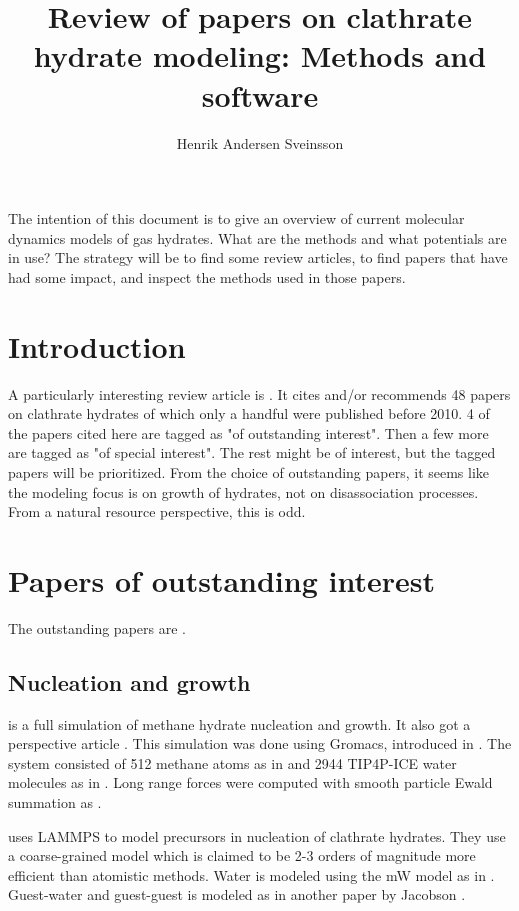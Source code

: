 \documentclass[a4paper]{article}
\author{Henrik Andersen Sveinsson}
\title{Review of papers on clathrate hydrate modeling: Methods and software}
\begin{document}

\maketitle

The intention of this document is to give an overview of current molecular dynamics models of gas hydrates. What are the methods and what potentials are in use? The strategy will be to find some review articles, to find papers that have had some impact, and inspect the methods used in those papers. 

\section{Introduction}
A particularly interesting review article is \cite{Barnes2013}. It cites and/or recommends 48 papers on clathrate hydrates of which only a handful were published before 2010. 4 of the papers cited here are tagged as "of outstanding interest". Then a few more are tagged as "of special interest". The rest might be of interest, but the tagged papers will be prioritized. From the choice of outstanding papers, it seems like the modeling focus is on growth of hydrates, not on disassociation processes. From a natural resource perspective, this is odd. 


\section{Papers of outstanding interest}
The outstanding papers are \cite{Walsh2009, Matsumoto2002, Jacobson2010, Jensen2010}.

\subsection{Nucleation and growth}
\cite{Walsh2009} is a full simulation of methane hydrate nucleation and growth. It also got a perspective article \cite{Debenedetti2009}. This simulation was done using Gromacs, introduced in \cite{Hess2008}. The system consisted of 512 methane atoms as in \cite{Goodbody1991} and 2944 TIP4P-ICE water molecules as in \cite{Abascal2005}. Long range forces were computed with smooth particle Ewald summation as \cite{Essmann1995}.

\cite{Jacobson2010} uses LAMMPS to model precursors in nucleation of clathrate hydrates. They use a coarse-grained model which is claimed to be 2-3 orders of magnitude more efficient than atomistic methods. Water is modeled using the mW model as in \cite{Molinero2009}. Guest-water and guest-guest is modeled as in another paper by Jacobson \cite{Jacobson2010b}.
\end{document}

